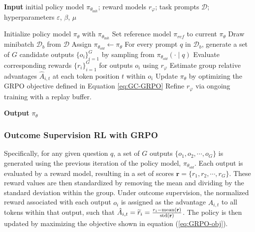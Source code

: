 \begin{itemize}[topsep=0pt]
\begin{itemize}[topsep=0pt]
\begin{algorithm}[t]
  \small
  \caption{Iterative Group Relative Policy Optimization}
  \textbf{Input} initial policy model $\pi_{\theta_{\text{init}}}$; reward models $r_\varphi$; task prompts $\mathcal{D}$; 
  hyperparameters $\varepsilon$, $\beta$, $\mu$
  \begin{algorithmic}[1]
    \State Initialize policy model $\pi_\theta$ with $\pi_{\theta_{\text{init}}}$
       \State Set reference model $\pi_{ref}$ to current $\pi_\theta$
      \State Draw minibatch $\mathcal{D}_b$ from $\mathcal{D}$
      \State Assign $\pi_{\theta_{old}} \leftarrow \pi_{\theta}$
      \State For every prompt $q$ in $\mathcal{D}_b$, generate a set of $G$ candidate outputs $\{o_i\}_{i=1}^G$ by sampling from $\pi_{\theta_{old}} (\cdot \mid q)$
      \State Evaluate corresponding rewards $\{r_i\}_{i=1}^{G}$ for outputs $o_i$ using $r_{\varphi}$
      \State Estimate group relative advantages $\hat{A}_{i,t}$ at each token position $t$ within $o_i$
        \State Update $\pi_{\theta}$ by optimizing the GRPO objective defined in Equation \ref{eq:GC-GRPO}
      \EndFor
    \EndFor 
    \State Refine $r_\varphi$ via ongoing training with a replay buffer.
    \EndFor 
  \end{algorithmic}
  \textbf{Output} $\pi_\theta$
  \label{alg:iter-grpo}
\end{algorithm}

\subsubsection{Outcome Supervision RL with GRPO} Specifically, for any given question $q$, a set of $G$ outputs $\{o_1, o_2, \cdots, o_G\}$ is generated using the previous iteration of the policy model, $\pi_{\theta_{old}}$. Each output is evaluated by a reward model, resulting in a set of scores $\mathbf{r}=\{r_1, r_2, \cdots, r_G\}$. These reward values are then standardized by removing the mean and dividing by the standard deviation within the group. Under outcome supervision, the normalized reward associated with each output $o_i$ is assigned as the advantage $\hat{A}_{i, t}$ to all tokens within that output, such that $\hat{A}_{i, t} = \widetilde{r}_i = \frac{r_i- {\rm mean}(\mathbf{r})}{{\rm std}(\mathbf{r})}$. The policy is then updated by maximizing the objective shown in equation (\ref{eq:GRPO-obj}).


\end{itemize}
\end{itemize}
